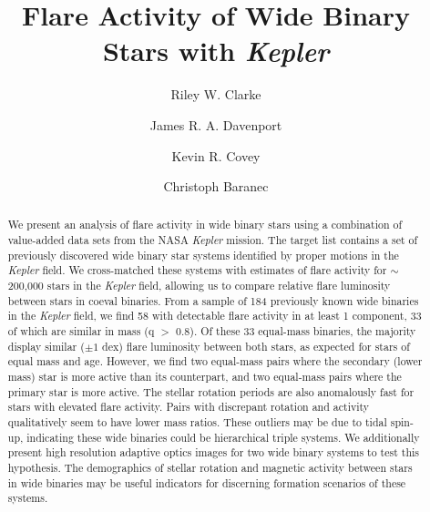 \documentclass[preprint2]{aastex61}
\newcommand{\Kepler}{\textsl{Kepler}\xspace}
\begin{document}
\title{Flare Activity of Wide Binary Stars with \Kepler}


\author{Riley W. Clarke}
	
\author{James R. A. Davenport}

\author{Kevin R. Covey}

\author{Christoph Baranec}


 

\begin{abstract}
We present an analysis of flare activity in wide binary stars using a combination of value-added data sets from the NASA \Kepler mission. The target list contains a set of previously discovered wide binary star systems identified by proper motions in the \Kepler field. We cross-matched these systems with estimates of flare activity for $\sim$200,000 stars in the \Kepler field, allowing us to compare relative flare luminosity between stars in coeval binaries. From a sample of 184 previously known wide binaries in the \Kepler field, we find 58 with detectable flare activity in at least 1 component, 33 of which are similar in mass (q $>$ 0.8). Of these 33 equal-mass binaries, the majority display similar ($\pm 1$ dex) flare luminosity between both stars, as expected for stars of equal mass and age. However, we find two equal-mass pairs where the secondary (lower mass) star is more active than its counterpart, and two equal-mass pairs where the primary star is more active. The stellar rotation periods are also anomalously fast for stars with elevated flare activity. Pairs with discrepant rotation and activity qualitatively seem to have lower mass ratios. These outliers may be due to tidal spin-up, indicating these wide binaries could be hierarchical triple systems. We additionally present high resolution adaptive optics images for two wide binary systems to test this hypothesis. The demographics of stellar rotation and magnetic activity between stars in wide binaries may be useful indicators for discerning formation scenarios of these systems. 
\end{abstract}
\end{document}
